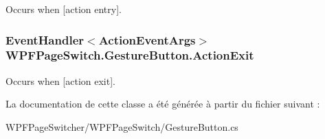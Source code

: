 Occurs when \mbox{[}action entry\mbox{]}. 

\hypertarget{class_w_p_f_page_switch_1_1_gesture_button_acf9c3e6a7b02cdbfbc24d420bc96f896}{
\subsubsection[{Action\+Exit}]{\setlength{\rightskip}{0pt plus 5cm}Event\+Handler$<${\bf Action\+Event\+Args}$>$ W\+P\+F\+Page\+Switch.\+Gesture\+Button.\+Action\+Exit}}\label{class_w_p_f_page_switch_1_1_gesture_button_acf9c3e6a7b02cdbfbc24d420bc96f896}


Occurs when \mbox{[}action exit\mbox{]}. 



La documentation de cette classe a été générée à partir du fichier suivant \+:\begin{DoxyCompactItemize}
\item 
W\+P\+F\+Page\+Switcher/\+W\+P\+F\+Page\+Switch/Gesture\+Button.\+cs\end{DoxyCompactItemize}
